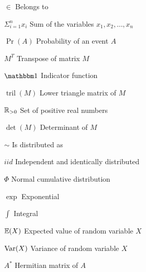   \begin{simbolos}
    \item[$\in$] Belongs to 
    \item[$\Sigma_{i=1}^n x_i$] Sum of the variables $x_1, x_2, \dots, x_n$
    \item[$\Pr(A)$] Probability of an event $A$
    \item[$M^T$] Transpose of matrix $M$
    \item[$\ind$] Indicator function 
    \item[$\operatorname{tril}(M)$] Lower triangle matrix of $M$
    \item[$\mathbb{R}_{>0}$] Set of positive real numbers
    \item[$\det(M)$] Determinant of $M$ 
    \item[$\sim$] Is distributed as 
    \item[$iid$] Independent and identically distributed
    \item[$\Phi$] Normal cumulative distribution
    \item[$\exp$] Exponential  
    \item[$\int$] Integral 
    \item[$\mathbb{E}(X)$] Expected value of random variable $X$ 
    \item[$\operatorname{Var}(X)$] Variance of random variable $X$
    \item[$A^*$] Hermitian matrix of $A$ 
  \end{simbolos}